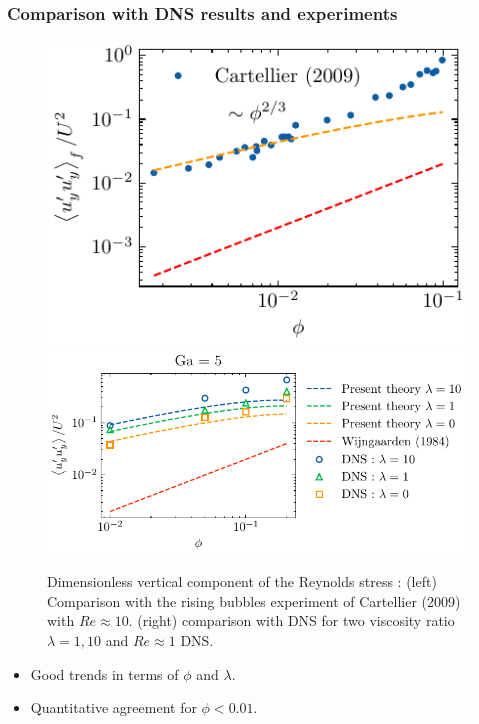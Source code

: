 \documentclass{sintefbeamer}
\begin{document}

\begin{frame}
  \frametitle{Comparison with DNS results and experiments}
  \begin{figure}[h!]
    \centering    
    \includegraphics[height = 0.25\textwidth]{image/HOMOGENEOUS_NEW/CA/cartellier.pdf}
    \includegraphics[height = 0.25\textwidth]{image/HOMOGENEOUS_NEW/CA/UUyy.pdf}
    \caption{
       Dimensionless vertical component of the Reynolds stress :
       (left) Comparison with the rising bubbles experiment of Cartellier (2009) with $Re \approx 10$. 
       (right) comparison with DNS for two viscosity ratio $\lambda =1,10$ and $Re \approx 1$ DNS. 
    }
    \label{fig:Cp}
\end{figure}  
\begin{itemize}
  \item Good trends in terms of $\phi$ and $\lambda$.  
  \item Quantitative agreement for $\phi < 0.01$.  
\end{itemize}
\end{frame}
\end{document}
